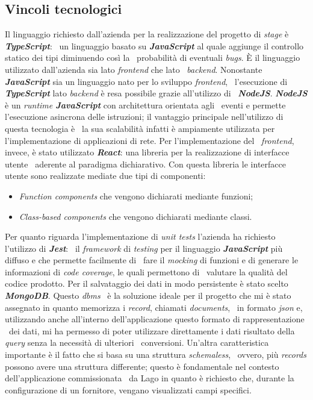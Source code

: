 \subsection{Vincoli tecnologici}
Il linguaggio richiesto dall'azienda per la realizzazione del progetto di \emph{stage} è \emph{\textbf{TypeScript}}: \
un linguaggio basato su \emph{\textbf{JavaScript}} al quale aggiunge il controllo statico dei tipi diminuendo così la \
probabilità di eventuali \emph{bugs}. È il linguaggio utilizzato dall'azienda sia lato \emph{\gls{frontend}} che lato \
\emph{\gls{backend}}. Nonostante \emph{\textbf{JavaScript}} sia un linguaggio nato per lo sviluppo \emph{frontend}, \
l'esecuzione di \emph{\textbf{TypeScript}} lato \emph{backend} è resa possibile grazie all'utilizzo di \
\emph{\textbf{NodeJS}}. \emph{\textbf{NodeJS}} è un \emph{runtime \textbf{JavaScript}} con architettura orientata agli \
eventi e permette l'esecuzione asincrona delle istruzioni; il vantaggio principale nell'utilizzo di questa tecnologia è \
la sua scalabilità infatti è ampiamente utilizzata per l'implementazione di applicazioni di rete. Per l'implementazione del \
\emph{frontend}, invece, è stato utilizzato \emph{\textbf{React}}: una libreria per la realizzazione di interfacce utente \
aderente al paradigma dichiarativo. Con questa libreria le interfacce utente sono realizzate mediate due tipi di componenti: \
\begin{itemize}
  \item \emph{Function components} che vengono dichiarati mediante funzioni;
  \item \emph{Class-based components} che vengono dichiarati mediante classi.
\end{itemize}
Per quanto riguarda l'implementazione di \emph{unit tests} l'azienda ha richiesto l'utilizzo di \emph{\textbf{Jest}}: \
il \emph{framework} di \emph{testing} per il linguaggio \emph{\textbf{JavaScript}} più diffuso e che permette facilmente di \
fare il \emph{mocking} di funzioni e di generare le informazioni di \emph{code coverage}, le quali permettono di \
valutare la qualità del codice prodotto.
Per il salvataggio dei dati in modo persistente è stato scelto \emph{\textbf{MongoDB}}. Questo \emph{\acrshort{dbms}} \
è la soluzione ideale per il progetto che mi è stato assegnato in quanto memorizza i \emph{record}, chiamati \emph{documents}, \
in formato \emph{\acrshort{json}} e, utilizzando anche all'interno dell'applicazione questo formato di rappresentazione \
dei dati, mi ha permesso di poter utilizzare direttamente i dati risultato della \emph{query} senza la necessità di ulteriori \
conversioni. Un'altra caratteristica importante è il fatto che si basa su una struttura \emph{schemaless}, \
ovvero, più \emph{records} possono avere una struttura differente; questo è fondamentale nel contesto dell'applicazione commissionata \
da Lago in quanto è richiesto che, durante la configurazione di un fornitore, vengano visualizzati campi specifici.

